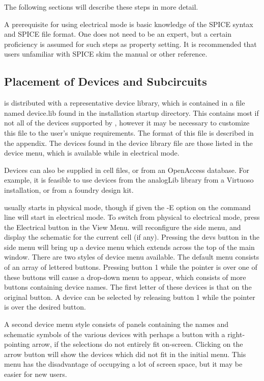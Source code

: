 The following sections will describe these steps in more detail.

A prerequisite for using electrical mode is basic knowledge of the
SPICE syntax and SPICE file format.  One does not need to be an
expert, but a certain proficiency is assumed for such steps as
property setting.  It is recommended that users unfamiliar with SPICE
skim the {\WRspice} manual or other reference.

\subsection{Placement of Devices and Subcircuits}

{\Xic} is distributed with a representative device library, which is
contained in a file named {\vt device.lib} found in the installation
startup directory.  This contains most if not all of the devices
supported by {\WRspice}, however it may be necessary to customize this
file to the user's unique requirements.  The format of this file is
described in the appendix.  The devices found in the device library
file are those listed in the device menu, which is available while in
electrical mode.

\ifoa
Devices can also be supplied in cell files, or from an OpenAccess
database.  For example, it is feasible to use devices from the {\vt
analogLib} library from a Virtuoso installation, or from a foundry
design kit.
\fi

{\Xic} usually starts in physical mode, though if given the {\et -E}
option on the command line {\Xic} will start in electrical mode.  To
switch from physical to electrical mode, press the {\cb Electrical}
button in the {\cb View Menu}.  {\Xic} will reconfigure the side menu,
and display the schematic for the current cell (if any).  Pressing the
{\cb devs} button in the side menu will bring up a device menu which
extends across the top of the main {\Xic} window.  There are two
styles of device menu available.  The default menu consists of an
array of lettered buttons.  Pressing button 1 while the pointer is
over one of these buttons will cause a drop-down menu to appear, which
consists of more buttons containing device names.  The first letter of
these devices is that on the original button.  A device can be
selected by releasing button 1 while the pointer is over the desired
button.

A second device menu style consists of panels containing the names and
schematic symbols of the various devices with perhaps a button with a
right-pointing arrow, if the selections do not entirely fit on-screen. 
Clicking on the arrow button will show the devices which did not fit
in the initial menu.  This menu has the disadvantage of occupying a
lot of screen space, but it may be easier for new users.


